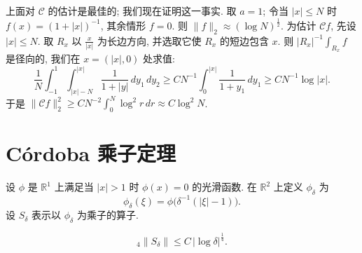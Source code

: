 \begin{remark}\label{rem:8.7}
上面对 $\mathcal{C}$ 的估计是最佳的; 我们现在证明这一事实. 取 $a=1$; 令当 $|x|\leq N$ 时 $f(x)=(1+|x|)^{-1}$, 其余情形 $f=0$. 则 $\|f\|_2\approx(\log N)^{\frac{1}{2}}$. 为估计 $\mathcal{C}f$, 先设 $|x|\leq N$. 取 $R_x$ 以 $\frac{x}{|x|}$ 为长边方向, 并选取它使 $R_x$ 的短边包含 $x$. 则 $|R_x|^{-1}\int_{R_x}f$ 是径向的, 我们在 $x=(|x|,0)$ 处求值:
\[
\frac{1}{N}\int_{-1}^{1}\int_{|x|-N}^{|x|}\frac{1}{1+|y|}\,dy_{1}\,dy_{2}
\geq C N^{-1}\int_{0}^{|x|}\frac{1}{1+y_{1}}\,dy_{1}
\geq C N^{-1}\log|x|.
\]
于是 $\|\mathcal{C}f\|_2^2\geq CN^{-2}\int_0^N\log^2 r\,dr\approx C\log^2 N$.
\end{remark}

\section{C\'ordoba 乘子定理}
\label{sec:8.3}

\begin{notation}\label{not:8.8}
设 $\phi$ 是 $\mathbb{R}^1$ 上满足当 $|x|>1$ 时 $\phi(x)=0$ 的光滑函数. 在 $\mathbb{R}^2$ 上定义 $\phi_\delta$ 为
\[
\phi_{\delta}(\xi)=\phi\bigl(\delta^{-1}(|\xi|-1)\bigr).
\]
设 $S_{\delta}$ 表示以 $\phi_{\delta}$ 为乘子的算子.
\end{notation}

\begin{theorem}\label{thm:8.9}
\[
{}_{4}\|S_{\delta}\|\leq C\,|\log\delta|^{\frac{1}{4}}.
\]
\end{theorem}

